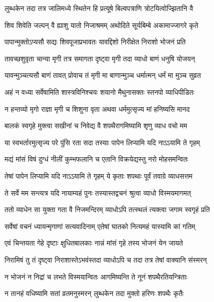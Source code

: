 \twolineshloka
{लुब्धकेन तदा तत्र जालिमध्ये स्थितेन हि}
{प्रत्यूषे बिल्वपत्राणि त्रोटयित्वोज्झितानि वै}%

\twolineshloka
{शिव शिवेति जल्पन् वै ह्याशु यातो निजाश्रमम्}
{अथोदिते सूर्यबिम्बे अकामाज्जागरे कृते}%

\twolineshloka
{पापान्मुक्तोऽप्यसौ सद्यः शिवपूजाप्रभावतः}
{यावद्दिशो निरीक्षेत निराशो भोजनं प्रति}%

\twolineshloka
{तावच्छशुवृता चान्या मृगी तत्र समागता}
{दृष्ट्वा मृगी तदा व्याधो बाणं धनुषि योजयन्}%

\twolineshloka
{यावन्मुञ्चत्यसौ बाणं तावत् प्रोवाच तं मृगी}
{मा बाणान्मुञ्च धर्मात्मन् धर्मं मा मुञ्च सुव्रत}%

\twolineshloka
{अहं न वध्या सर्वेषामिति शास्त्रविनिश्चयः}
{शयानो मैथुनासक्तः स्तनपो व्याधिपीडितः}%

\twolineshloka
{न हन्तव्यो मृगो राज्ञा मृगी च शिशुना वृता}
{अथवा धर्ममुत्सृज्य मां हनिष्यसि मानद}%

\twolineshloka
{बालकं स्वगृहे मुक्त्वा सखीनां च निवेद्य वै}
{शपथैरागमिष्यामि शृणु व्याध वचो मम}%

\twolineshloka
{या स्वभर्तारमुत्सृज्य परे पुंसि रता सदा}
{तस्याः पापेन लिप्यामि यदि नाऽऽयामि ते गृहम्}%

\twolineshloka
{मद्यं मांसं विषं दुग्धं नीलीं कुम्भफलानि च}
{एतानि विक्रयेद्यस्तु नरो मोहसमन्वितः}%

\twolineshloka
{तेषां पापेन लिप्यामि यदि नाऽऽयामि ते गृहम्}
{ये कृताः शपथाः पूर्वं तवाग्रे व्याधसत्तम}%

\twolineshloka
{ते सर्वे मम सन्त्यत्र यदि नायाम्यहं पुनः}
{तस्यास्तद्वचनं श्रुत्वा व्याधो विस्मयमागमत्}%

\twolineshloka
{ततो व्याधेन सा युक्ता गता वै निजमन्दिरम्}
{व्याधोऽपि तत्स्थलं त्यक्त्वा जगाम स्वगृहं प्रति}%

\twolineshloka
{सर्वेषां वचनं ध्यायन्मृगाणां सत्यवादिनाम्}
{एतेषां घातको नित्यमहं यास्यामि कां गतिम्}%

\twolineshloka
{एवं चिन्तयता गेहे दृष्टाः क्षुधितबालकाः}
{नान्नं मांसं गृहे तस्य भोजनं येन जायते}%

\twolineshloka
{निरामिषं तु तं दृष्ट्वा निराशास्तेऽभवंस्तदा}
{व्याधोऽपि च तदा तत्र तेषां वाक्यानि संस्मरन्}%

\twolineshloka
{न भोजनं न निद्रां च लभते विस्मयान्वितः}
{आगमिष्यन्ति ते नूनं शपथैरतियन्त्रिताः}%

\twolineshloka
{न तानहं वधिष्यामि सतां व्रतमनुस्मरन्}
{लुब्धकेन तदा मुक्तो हरिणः शपथैः कृतैः}%

